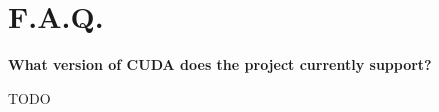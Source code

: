\section{F.A.Q.}
\bfseries What version of CUDA does the project currently support?

\noindent \mdseries TODO

\noindent \bfseries 

\pagebreak
